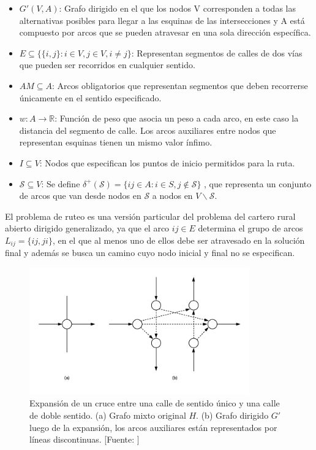 \begin{itemize}
\item $G'(V, A)$: Grafo dirigido en el que los nodos V corresponden a todas las alternativas posibles para llegar a las esquinas de las intersecciones y A está compuesto por arcos que se pueden atravesar en una sola dirección específica.

\item $E \subseteq \{ \{i, j\}: i \in V, j \in V, i \neq j\}$: Representan segmentos de calles de dos vías que pueden ser recorridos en cualquier sentido.

\item $AM \subseteq A $: Arcos obligatorios que representan segmentos que deben recorrerse únicamente en el sentido especificado.

\item $w : A \rightarrow \mathbb{R} $: Función de peso que asocia un peso a cada arco, en este caso la distancia del segmento de calle. Los arcos auxiliares entre nodos que representan esquinas tienen un mismo valor ínfimo.

\item $I \subseteq V $: Nodos que especifican los puntos de inicio permitidos para la ruta.

\item $\mathcal{S} \subseteq V$: Se define $\delta^+ (\mathcal{S}) = \{i j \in A: i \in S , j \notin \mathcal{S} \}$ , que representa un conjunto de arcos que van desde nodos en $\mathcal{\mathcal{S}}$ a nodos en $V \backslash \mathcal{S}$.
\end{itemize}

El problema de ruteo es una versión particular del problema del cartero rural abierto dirigido generalizado, ya que el arco $i j \in E $ determina el grupo de arcos $L_{i j} = \{i j, j i\}$, en el que al menos uno de ellos debe ser atravesado en la solución final y además se busca un camino cuyo nodo inicial y final no se especifican.

\begin{figure}[tbp]
\centerline{\includegraphics[width=9.5cm]{expanded_graph.png}}
\caption{Expansión de un cruce entre una calle de sentido único y una calle de doble sentido. (a) Grafo mixto original $H$. (b) Grafo dirigido $G'$ luego de la expansión, los arcos auxiliares están representados por líneas discontinuas. [Fuente: \citet{Braier2017AnArgentina}]}
\label{fig:grafo_expandido}
\end{figure}

